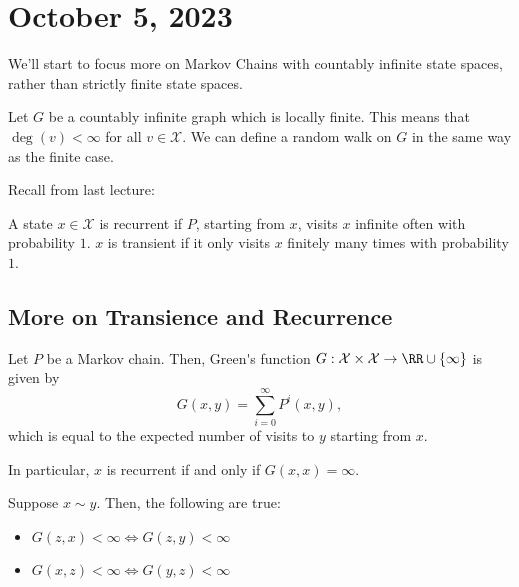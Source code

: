 \section{October 5, 2023}

We'll start to focus more on Markov Chains with countably infinite state spaces, rather than strictly finite state spaces.

\begin{definition}

Let $G$ be a countably infinite graph which is \ac{locally finite}. This means that $\deg(v) < \infty$ for all $v\in \mathcal{X}$. We can define a random walk on $G$ in the same way as the finite case. 
\end{definition}

Recall from last lecture: 

\begin{definition}

A state $x\in \mathcal{X}$ is recurrent if $P$, starting from $x$, visits $x$ infinite often with probability $1$. $x$ is transient if it only visits $x$ finitely many times with probability $1$. 
\end{definition}

\subsection{More on Transience and Recurrence}

\begin{definition}

Let $P$ be a Markov chain. Then, \ac{Green's function} $G: \mathcal{X}\times \mathcal{X}\rightarrow \RR\cup \{\infty\}$ is given by 
\[G(x,y) = \sum_{i=0}^{\infty}P^i(x,y),\]
which is equal to the expected number of visits to $y$ starting from $x$. 
\end{definition}

In particular, $x$ is recurrent if and only if $G(x,x)=\infty$. 

\begin{theorem}
\proplabel

Suppose $x\sim y$. Then, the following are true:  
\begin{itemize}
    \item $G(z,x) < \infty\iff G(z,y) < \infty$
    \item $G(x,z) < \infty\iff G(y,z) < \infty$
\end{itemize}
\end{theorem}

